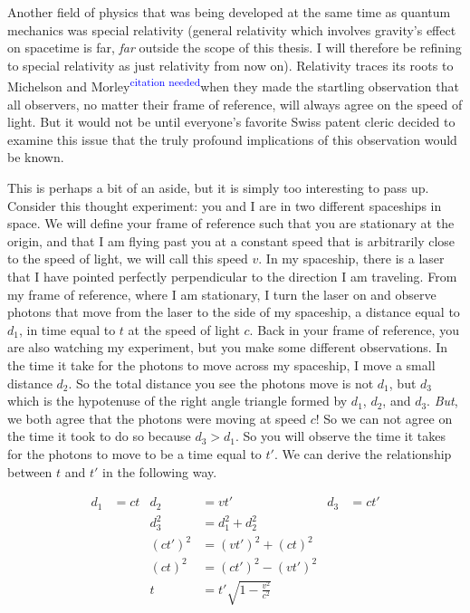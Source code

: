 \documentclass[12pt]{report}
\newcommand{\citethis}{\textsuperscript{\textcolor{blue}{citation needed}}} %
\begin{document}
Another field of physics that was being developed at the same time as quantum mechanics was special relativity (general relativity which involves gravity's effect on spacetime is far, \textit{far} outside the scope of this thesis. I will therefore be refining to special relativity as just relativity from now on). Relativity traces its roots to Michelson and Morley\citethis when they made the startling observation that all observers, no matter their frame of reference, will always agree on the speed of light. But it would not be until everyone's favorite Swiss patent cleric decided to examine this issue that the truly profound implications of this observation would be known. 

This is perhaps a bit of an aside, but it is simply too interesting to pass up. Consider this thought experiment: you and I are in two different spaceships in space. We will define your frame of reference such that you are stationary at the origin, and that I am flying past you at a constant speed that is arbitrarily close to the speed of light, we will call this speed $v$. In my spaceship, there is a laser that I have pointed perfectly perpendicular to the direction I am traveling. From my frame of reference, where I am stationary, I turn the laser on and observe photons that move from the laser to the side of my spaceship, a distance equal to $d_{1}$, in time equal to $t$ at the speed of light $c$. Back in your frame of reference, you are also watching my experiment, but you make some different observations. In the time it take for the photons to move across my spaceship, I move a small distance $d_{2}$. So the total distance you see the photons move is not $d_{1}$, but $d_{3}$ which is the hypotenuse of the right angle triangle formed by $d_{1}$, $d_{2}$, and $d_{3}$. \textit{But}, we both agree that the photons were moving at speed $c$! So we can not agree on the time it took to do so because $d_{3} > d_{1}$. So you will observe the time it takes for the photons to move to be a time equal to $t'$. We can derive the relationship between $t$ and $t'$ in the following way.

\begin{align}
\label{eq:rel_proof}
d_{1} &	= ct	&	d_{2} &	= vt'	&	d_{3} &	=ct'	\\
&&	d_{3}^{2}	&	=d_{1}^{2}+d_{2}^{2}		\\
&&	(ct')^{2}	&	=(vt')^{2} + (ct)^{2}	\\
&&	(ct)^{2}	&	=(ct')^{2} - (vt')^{2}	\\
&&	t	&	=t'\sqrt{1 - \frac{v^{2}}{c^{2}}}
\label{eq:rel_proof_2}
\end{align} 
\end{document}

